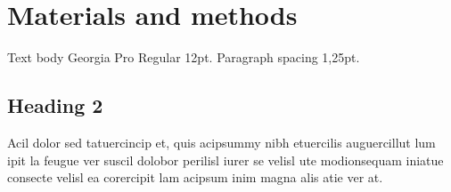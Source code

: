 \chapter{Materials and methods}
Text body Georgia Pro Regular 12pt. Paragraph spacing 1,25pt.
\section{Heading 2}
Acil dolor sed tatuercincip et, quis acipsummy nibh etuercilis auguercillut lum ipit la feugue ver suscil dolobor perilisl iurer se velisl ute modionsequam iniatue consecte velisl ea corercipit lam acipsum inim magna alis atie ver at.